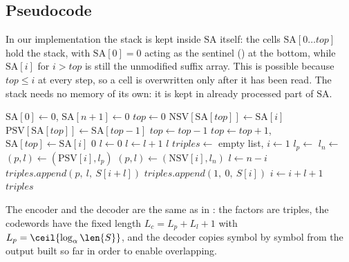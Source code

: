 \subsection{Pseudocode}
In our implementation the stack is kept inside \(\mathrm{SA}\) itself: the cells \(\mathrm{SA}[0 \ldots \mathit{top}]\) hold the stack, with \(\mathrm{SA}[0] = 0\) acting as the sentinel () at the bottom, while \(\mathrm{SA}[i]\) for \(i > \mathit{top}\) is still the unmodified suffix array. This is possible because \(\mathit{top} \leq i\) at every step, so a cell is overwritten only after it has been read. The stack needs no memory of its own: it is kept in already processed part of \(\mathrm{SA}\).
\begin{algorithm}[H]
\caption{KKP3: computing $\mathrm{PSV}$, $\mathrm{NSV}$ and the factors}
\label{alg:kkp-scan}
\begin{algorithmic}[1]
    \State $\mathrm{SA}[0] \gets 0$, \quad $\mathrm{SA}[n+1] \gets 0$
    \State $\mathit{top} \gets 0$
            \State $\mathrm{NSV}[\mathrm{SA}[\mathit{top}]] \gets \mathrm{SA}[i]$
            \State $\mathrm{PSV}[\mathrm{SA}[\mathit{top}]] \gets \mathrm{SA}[\mathit{top} - 1]$
            \State $\mathit{top} \gets \mathit{top} - 1$
        \EndWhile
        \State $\mathit{top} \gets \mathit{top} + 1$, \quad $\mathrm{SA}[\mathit{top}] \gets \mathrm{SA}[i]$
    \EndFor
\EndProcedure
\Statex
{}
        \State \Return $0$
    \EndIf
    \State $l \gets 0$
        \State $l \gets l + 1$
    \EndWhile
    \State \Return $l$
\EndFunction
\Statex
{}
    \State $triples \gets$ empty list, \quad $i \gets 1$
        \State $l_p \gets {}$
        \State $l_n \gets {}$
            \State $(p, l) \gets (\mathrm{PSV}[i], l_p)$
        \Else
            \State $(p, l) \gets (\mathrm{NSV}[i], l_n)$
        \EndIf
            \State $l \gets n - i$
        \EndIf
            \State $triples.append(p, \ l, \ S[i + l])$
        \Else
            \State $triples.append(1, \ 0, \ S[i])$
        \EndIf
        \State $i \gets i + l + 1$
    \EndWhile
    \State \Return $triples$
\EndFunction
\end{algorithmic}
\end{algorithm}

The encoder and the decoder are the same as in : the factors are triples, the codewords have the fixed length \(L_c = L_p + L_l + 1\) with \(L_p = \ceil{\log_\alpha \len{S}}\), and the decoder copies symbol by symbol from the output built so far in order to enable overlapping.